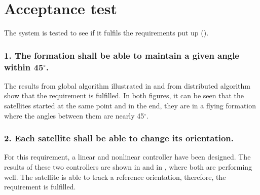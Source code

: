 \chapter{Acceptance test} \label{chap:acceptanceTest}
The system is tested to see if it fulfils the requirements put up ().

\subsection{1. The formation shall be able to maintain a given angle within 45$^{\circ}$.}
The results from global algorithm illustrated in  and from distributed algorithm  show that the requirement is fulfilled. In both figures, it can be seen that the satellites started at the same point and in the end, they are in a flying formation where the angles between them are nearly 45$^{\circ}$.
\subsection{2. Each satellite shall be able to change its orientation.}
For this requirement, a linear and nonlinear controller have been designed. The results of these two controllers are shown in  and in , where both are performing well. The satellite is able to track a reference orientation, therefore, the requirement is fulfilled.


